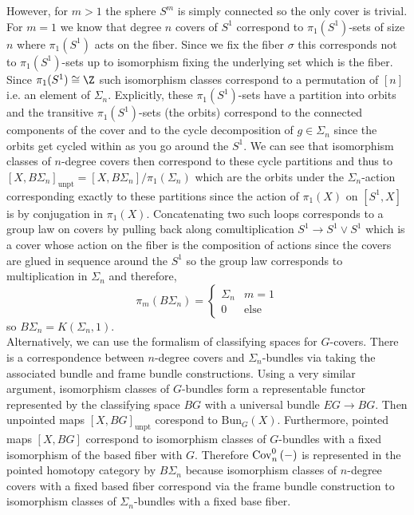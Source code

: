 \documentclass[12pt]{extarticle}
\newcommand{\Bun}{\mathrm{Bun}}
\begin{document}
However, for $m > 1$ the sphere $S^m$ is simply connected so the only cover is trivial. For $m = 1$ we know that degree $n$ covers of $S^1$ correspond to $\pi_1(S^1)$-sets of size $n$ where $\pi_1(S^1)$ acts on the fiber. Since we fix the fiber $\sigma$ this corresponds not to $\pi_1(S^1)$-sets up to isomorphism fixing the underlying set which is the fiber. Since $\pi_1(S^1) \cong \Z$ such isomorphism classes correspond to a permutation of $[n]$ i.e. an element of $\Sigma_n$. Explicitly, these $\pi_1(S^1)$-sets have a partition into orbits and the transitive $\pi_1(S^1)$-sets (the orbits) correspond to the connected components of the cover and to the cycle decomposition of $g \in \Sigma_n$ since the orbits get cycled within as you go around the $S^1$. We can see that isomorphism classes of $n$-degree covers then correspond to these cycle partitions and thus to $[X, B\Sigma_n]_{\text{unpt}} = [X, B \Sigma_n]/\pi_1(\Sigma_n)$ which are the orbits under the $\Sigma_n$-action corresponding exactly to these partitions since the action of $\pi_1(X)$ on $[S^1, X]$ is by conjugation in $\pi_1(X)$. Concatenating two such loops corresponds to a group law on covers by pulling back along comultiplication $S^1 \to S^1 \vee S^1$ which is a cover whose action on the fiber is the composition of actions since the covers are glued in sequence around the $S^1$ so the group law corresponds to multiplication in $\Sigma_n$ and therefore,
\[ \pi_m(B \Sigma_n) = 
\begin{cases}
\Sigma_n & m = 1
\\
0 & \text{else}
\end{cases} \]
so $B \Sigma_n = K(\Sigma_n, 1)$.
\bigskip\\
Alternatively, we can use the formalism of classifying spaces for $G$-covers. There is a correspondence between $n$-degree covers and $\Sigma_n$-bundles via taking the associated bundle and frame bundle constructions. Using a very similar argument, isomorphism classes of $G$-bundles form a representable functor represented by the classifying space $BG$ with a universal bundle $EG \to BG$. Then unpointed maps $[X, BG]_{\text{unpt}}$ corespond to $\Bun_G(X)$. Furthermore, pointed maps $[X, BG]$ correspond to isomorphism classes of $G$-bundles with a fixed isomorphism of the based fiber with $G$. Therefore $\mathrm{Cov}^0_n\left(-\right)$ is represented in the pointed homotopy category by $B \Sigma_n$ because isomorphism classes of $n$-degree covers with a fixed based fiber correspond via the frame bundle construction to isomorphism classes of $\Sigma_n$-bundles with a fixed base fiber. 
\end{document}
